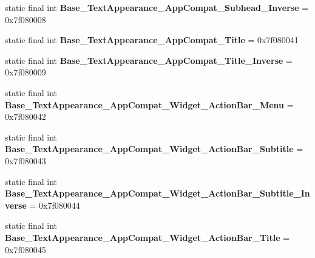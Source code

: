 \begin{DoxyCompactItemize}
\item 
\hypertarget{classandroid_1_1support_1_1design_1_1_r_1_1style_a391e6f44fa78e45e80ca3d5cf698c53d}{}static final int {\bfseries Base\+\_\+\+Text\+Appearance\+\_\+\+App\+Compat\+\_\+\+Subhead\+\_\+\+Inverse} = 0x7f080008\label{classandroid_1_1support_1_1design_1_1_r_1_1style_a391e6f44fa78e45e80ca3d5cf698c53d}

\item 
\hypertarget{classandroid_1_1support_1_1design_1_1_r_1_1style_aaeb1ba36694a5afaceb50327101c788c}{}static final int {\bfseries Base\+\_\+\+Text\+Appearance\+\_\+\+App\+Compat\+\_\+\+Title} = 0x7f080041\label{classandroid_1_1support_1_1design_1_1_r_1_1style_aaeb1ba36694a5afaceb50327101c788c}

\item 
\hypertarget{classandroid_1_1support_1_1design_1_1_r_1_1style_a1128f32591ae2aade3e42c5d6f4c7c3d}{}static final int {\bfseries Base\+\_\+\+Text\+Appearance\+\_\+\+App\+Compat\+\_\+\+Title\+\_\+\+Inverse} = 0x7f080009\label{classandroid_1_1support_1_1design_1_1_r_1_1style_a1128f32591ae2aade3e42c5d6f4c7c3d}

\item 
\hypertarget{classandroid_1_1support_1_1design_1_1_r_1_1style_a631791e6b12ffaa53f20b6ff3b5b42d1}{}static final int {\bfseries Base\+\_\+\+Text\+Appearance\+\_\+\+App\+Compat\+\_\+\+Widget\+\_\+\+Action\+Bar\+\_\+\+Menu} = 0x7f080042\label{classandroid_1_1support_1_1design_1_1_r_1_1style_a631791e6b12ffaa53f20b6ff3b5b42d1}

\item 
\hypertarget{classandroid_1_1support_1_1design_1_1_r_1_1style_af9dc756dbf9823a4e711f295a3ce6756}{}static final int {\bfseries Base\+\_\+\+Text\+Appearance\+\_\+\+App\+Compat\+\_\+\+Widget\+\_\+\+Action\+Bar\+\_\+\+Subtitle} = 0x7f080043\label{classandroid_1_1support_1_1design_1_1_r_1_1style_af9dc756dbf9823a4e711f295a3ce6756}

\item 
\hypertarget{classandroid_1_1support_1_1design_1_1_r_1_1style_afb0b9a877ffad2046b76360f7e097b50}{}static final int {\bfseries Base\+\_\+\+Text\+Appearance\+\_\+\+App\+Compat\+\_\+\+Widget\+\_\+\+Action\+Bar\+\_\+\+Subtitle\+\_\+\+Inverse} = 0x7f080044\label{classandroid_1_1support_1_1design_1_1_r_1_1style_afb0b9a877ffad2046b76360f7e097b50}

\item 
\hypertarget{classandroid_1_1support_1_1design_1_1_r_1_1style_a86a9497cb9bcb3081388140593c9d85b}{}static final int {\bfseries Base\+\_\+\+Text\+Appearance\+\_\+\+App\+Compat\+\_\+\+Widget\+\_\+\+Action\+Bar\+\_\+\+Title} = 0x7f080045\label{classandroid_1_1support_1_1design_1_1_r_1_1style_a86a9497cb9bcb3081388140593c9d85b}


\end{DoxyCompactItemize}
